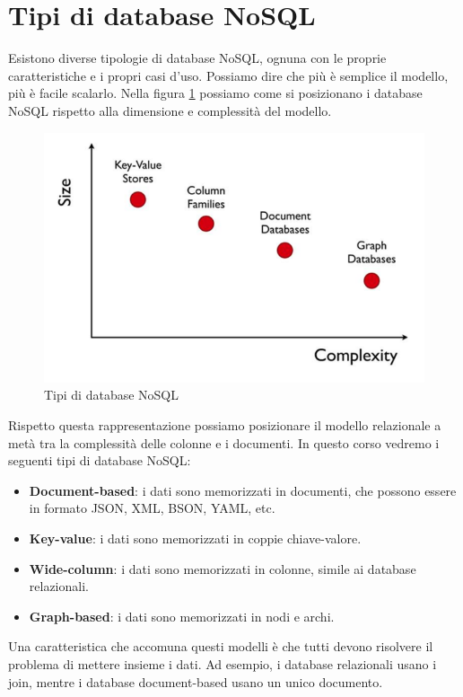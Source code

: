 \section{Tipi di database NoSQL}
Esistono diverse tipologie di database NoSQL, ognuna con le proprie caratteristiche
e i propri casi d'uso. Possiamo dire che più è semplice il modello, più è facile
scalarlo. Nella figura \ref{fig:tipi_nosql} possiamo come si posizionano i
database NoSQL rispetto alla dimensione e complessità del modello.
\begin{figure}[!ht]
    \centering
    \includegraphics[scale=0.5]{./img/nosql/tipi_nosql.png}
    \caption{Tipi di database NoSQL}
    \label{fig:tipi_nosql}
\end{figure}
Rispetto questa rappresentazione possiamo posizionare il modello relazionale a metà
tra la complessità delle colonne e i documenti.
In questo corso vedremo i seguenti tipi di database NoSQL:
\begin{itemize}
    \item \textbf{Document-based}: i dati sono memorizzati in documenti, che
          possono essere in formato JSON, XML, BSON, YAML, etc.
    \item \textbf{Key-value}: i dati sono memorizzati in coppie chiave-valore.
    \item \textbf{Wide-column}: i dati sono memorizzati in colonne, simile ai
          database relazionali.
    \item \textbf{Graph-based}: i dati sono memorizzati in nodi e archi.
\end{itemize}
Una caratteristica che accomuna questi modelli è che tutti devono risolvere il 
problema di mettere insieme i dati. Ad esempio, i database relazionali usano i join,
mentre i database document-based usano un unico documento.
